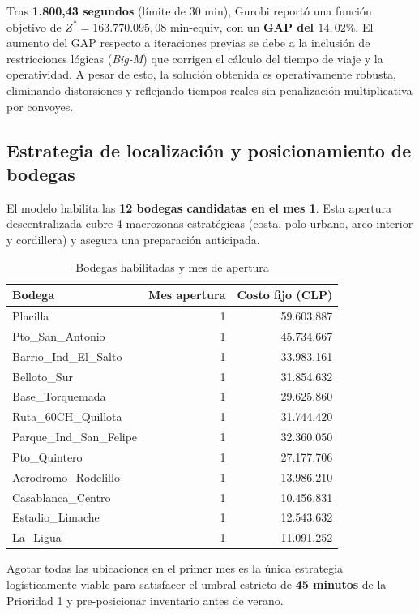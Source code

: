 \documentclass[letterpaper]{article}
\begin{document}
\begin{flushleft}
Tras \textbf{1.800,43 segundos} (límite de 30 min), Gurobi reportó una función objetivo de $Z^* = 163.770.095{,}08$ min-equiv, con un \textbf{GAP del $14{,}02\%$}. El aumento del GAP respecto a iteraciones previas se debe a la inclusión de restricciones lógicas (\textit{Big-M}) que corrigen el cálculo del tiempo de viaje y la operatividad. A pesar de esto, la solución obtenida es operativamente robusta, eliminando distorsiones y reflejando tiempos reales sin penalización multiplicativa por convoyes.

\subsection{Estrategia de localización y posicionamiento de bodegas}

El modelo habilita las \textbf{12 bodegas candidatas en el mes 1}. Esta apertura descentralizada cubre 4 macrozonas estratégicas (costa, polo urbano, arco interior y cordillera) y asegura una preparación anticipada.

\begin{table}[H]
\centering
\caption{Bodegas habilitadas y mes de apertura}
\label{tab:bodegas_abiertas}
\begin{tabular}{lrr}
\hline
\textbf{Bodega} & \textbf{Mes apertura} & \textbf{Costo fijo (CLP)} \\
\hline
Placilla                & 1 & 59.603.887 \\
Pto\_San\_Antonio       & 1 & 45.734.667 \\
Barrio\_Ind\_El\_Salto  & 1 & 33.983.161 \\
Belloto\_Sur            & 1 & 31.854.632 \\
Base\_Torquemada        & 1 & 29.625.860 \\
Ruta\_60CH\_Quillota    & 1 & 31.744.420 \\
Parque\_Ind\_San\_Felipe & 1 & 32.360.050 \\
Pto\_Quintero           & 1 & 27.177.706 \\
Aerodromo\_Rodelillo    & 1 & 13.986.210 \\
Casablanca\_Centro      & 1 & 10.456.831 \\
Estadio\_Limache        & 1 & 12.543.632 \\
La\_Ligua               & 1 & 11.091.252 \\
\hline
\end{tabular}
\end{table}

Agotar todas las ubicaciones en el primer mes es la única estrategia logísticamente viable para satisfacer el umbral estricto de \textbf{45 minutos} de la Prioridad 1 y pre-posicionar inventario antes de verano.


\end{flushleft}
\end{document}
